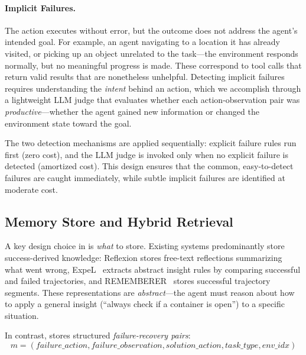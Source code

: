 \paragraph{Implicit Failures.} The action executes without error, but the outcome does not address the agent's intended goal. For example, an agent navigating to a location it has already visited, or picking up an object unrelated to the task---the environment responds normally, but no meaningful progress is made. These correspond to tool calls that return valid results that are nonetheless unhelpful. Detecting implicit failures requires understanding the \emph{intent} behind an action, which we accomplish through a lightweight LLM judge that evaluates whether each action-observation pair was \emph{productive}---whether the agent gained new information or changed the environment state toward the goal.

The two detection mechanisms are applied sequentially: explicit failure rules run first (zero cost), and the LLM judge is invoked only when no explicit failure is detected (amortized cost). This design ensures that the common, easy-to-detect failures are caught immediately, while subtle implicit failures are identified at moderate cost.

\subsection{Memory Store and Hybrid Retrieval}
\label{sec:retrieval}

A key design choice in \method{} is \emph{what} to store. Existing systems predominantly store success-derived knowledge: Reflexion stores free-text reflections summarizing what went wrong, ExpeL~\citep{zhao2024expel} extracts abstract insight rules by comparing successful and failed trajectories, and REMEMBERER~\citep{majumder2023rememberer} stores successful trajectory segments. These representations are \emph{abstract}---the agent must reason about how to apply a general insight (``always check if a container is open'') to a specific situation.

In contrast, \method{} stores structured \emph{failure-recovery pairs}:
\begin{equation}
    m = (\textit{failure\_action}, \textit{failure\_observation}, \textit{solution\_action}, \textit{task\_type}, \textit{env\_idx})
\end{equation}

